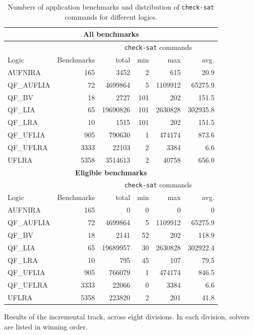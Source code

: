 \documentclass[twoside,11pt]{article}
\begin{document}
\begin{table}
\centering
\begin{tabular}{|l|r|rrrr|}
\multicolumn{6}{c}{\textbf{All benchmarks}} \\
\hline
&  & \multicolumn{4}{c|}{\lstinline{check-sat} commands} \\
 Logic & Benchmarks & total & min & max & avg. \\
\hline
AUFNIRA & 165  & 3452 & 2 & 615 & 20.9 \\
QF\_AUFLIA & 72 & 4699864 & 5 & 1109912 & 65275.9 \\
QF\_BV & 18 & 2727 & 101 & 202 & 151.5 \\
QF\_LIA & 65 & 19690826 & 101 & 2630828 & 302935.8 \\
QF\_LRA & 10 & 1515 & 101 & 202 & 151.5 \\
QF\_UFLIA & 905 & 790630 & 1 & 474174 & 873.6 \\
QF\_UFLRA & 3333 & 22103 & 2 & 3384 & 6.6 \\
UFLRA & 5358 & 3514613 & 2 & 40758 & 656.0 \\
\hline
\multicolumn{6}{c}{\textbf{Eligible benchmarks}} \\
\hline
&  & \multicolumn{4}{c|}{\lstinline{check-sat} commands} \\
 Logic & Benchmarks & total & min & max & avg. \\
\hline
AUFNIRA & 165  & 0 & 0 & 0 & 0 \\
QF\_AUFLIA & 72 & 4699864 & 5 & 1109912 & 65275.9 \\
QF\_BV & 18 & 2141 & 52 & 202 & 118.9 \\
QF\_LIA & 65 & 19689957 & 30 & 2630828 & 302922.4 \\
QF\_LRA & 10 & 795 & 45 & 107 & 79.5 \\
QF\_UFLIA & 905 & 766079 & 1 & 474174 & 846.5 \\
QF\_UFLRA & 3333 & 22066 & 0 & 3384 & 6.6 \\
UFLRA & 5358 & 223820 & 2 & 201 & 41.8 \\
\hline
\end{tabular}
\caption{Numbers of application benchmarks and distribution of \lstinline{check-sat} commands for different logics.}
\label{Fig:apptrack-benchmarks}
\end{table}
 

\begin{table}
\centering

\caption{Results of the incremental track, across eight divisions. In each division, solvers are listed in winning order.}
\label{Fig:apptrack-results}
\end{table}
\end{document}

